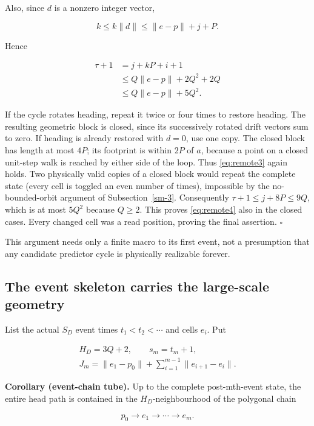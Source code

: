 \documentclass[
  11pt,
]{article}
\begin{document}
Also, since \(d\) is a nonzero integer vector,

\[
k\le k\|d\|\le\|e-p\|+j+P.
\]

Hence

\begin{equation}\label{eq:remote6}
\begin{aligned}\tau+1&=j+kP+i+1\\&\le Q\|e-p\|+2Q^2+2Q\\&\le Q\|e-p\|+5Q^2.\end{aligned}
\end{equation}

If the cycle rotates heading, repeat it twice or four times to restore
heading. The resulting geometric block is closed, since its successively
rotated drift vectors sum to zero. If heading is already restored with
\(d=0\), use one copy. The closed block has length at most \(4P\); its footprint
is within \(2P\) of \(a\), because a point on a closed unit-step walk is reached
by either side of the loop. Thus \eqref{eq:remote3} again holds. Two physically
valid copies of a closed block would repeat the complete state (every
cell is toggled an even number of times), impossible by
the no-bounded-orbit argument of Subsection~\ref{sm-3}. Consequently
$\tau+1\le j+8P\le9Q$, which is at most $5Q^2$ because
$Q\ge2$. This proves \eqref{eq:remote4} also in the closed cases. Every
changed cell was a read position, proving the final assertion.
\(\square\)

This argument needs only a finite macro to its first event, not a
presumption that any candidate predictor cycle is physically realizable
forever.

\subsection{The event skeleton carries the large-scale
geometry}\label{remote-3}

List the actual $S_D$ event times $t_1<t_2<\cdots$ and
cells $e_i$. Put

\[
\begin{gathered}H_D=3Q+2,\qquad s_m=t_m+1,\\J_m=\|e_1-p_0\|+\sum_{i=1}^{m-1}\|e_{i+1}-e_i\|.\end{gathered}
\]

\textbf{Corollary (event-chain tube).} Up to the complete post-mth-event state, the
entire head path is contained in the $H_D$-neighbourhood of the polygonal
chain

\begin{equation}\label{eq:remote7}
p_0\longrightarrow e_1\longrightarrow\cdots\longrightarrow e_m.
\end{equation}
\end{document}
